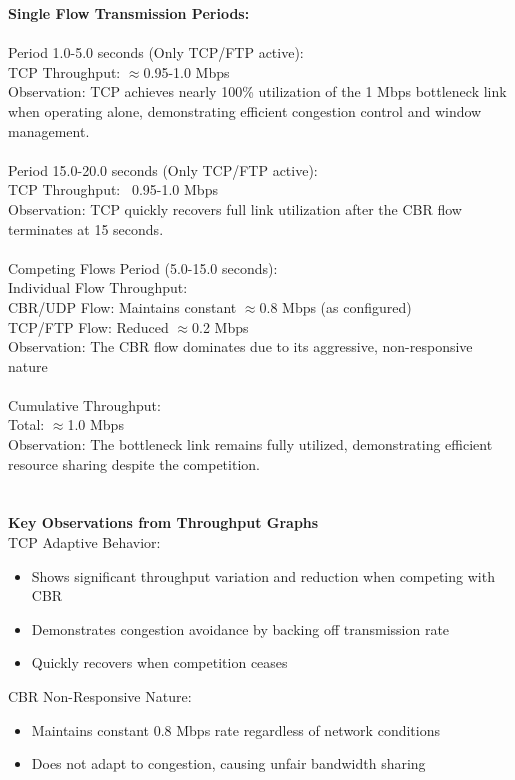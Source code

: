 \documentclass[12pt]{article}
\begin{document}
	\textbf{Single Flow Transmission Periods:}	\\
	\noindent	\\
	Period 1.0-5.0 seconds (Only TCP/FTP active):	\\
	TCP Throughput: $\approx$0.95-1.0 Mbps	\\
	Observation: TCP achieves nearly 100\% utilization of the 1 Mbps bottleneck link when operating alone, demonstrating efficient congestion control and window management.\\
	\noindent	\\
	Period 15.0-20.0 seconds (Only TCP/FTP active):	\\
	TCP Throughput: ~0.95-1.0 Mbps	\\
	Observation: TCP quickly recovers full link utilization after the CBR flow terminates at 15 seconds.	\\
	\noindent	\\
	Competing Flows Period (5.0-15.0 seconds):	\\
	Individual Flow Throughput:	\\
	CBR/UDP Flow: Maintains constant $\approx$0.8 Mbps (as configured)	\\
	TCP/FTP Flow: Reduced $\approx$0.2 Mbps	\\
	Observation: The CBR flow dominates due to its aggressive, non-responsive nature	\\
	\noindent	\\
	Cumulative Throughput:	\\
	Total: $\approx$1.0 Mbps	\\
	Observation: The bottleneck link remains fully utilized, demonstrating efficient resource sharing despite the competition.	\\	\\
	\noindent	\\
	\textbf{Key Observations from Throughput Graphs}	\\
	TCP Adaptive Behavior:
	\begin{itemize}
		\item Shows significant throughput variation and reduction when competing with CBR
		\item Demonstrates congestion avoidance by backing off transmission rate
		\item Quickly recovers when competition ceases
	\end{itemize}
	
	\noindent
	CBR Non-Responsive Nature:
	\begin{itemize}
		\item Maintains constant 0.8 Mbps rate regardless of network conditions
		\item Does not adapt to congestion, causing unfair bandwidth sharing
	\end{itemize}
	
\end{document}
